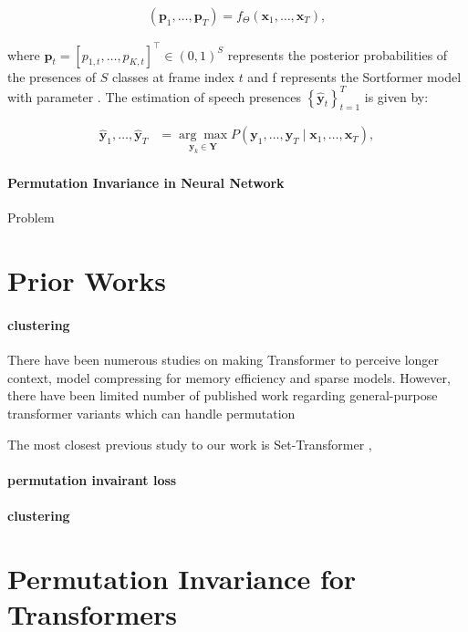\documentclass{article}
\begin{document}
\begin{align}
\left(\mathbf{p}_1, \ldots, \mathbf{p}_T\right) = f_{\Theta}\left(\mathbf{x}_1, \ldots, \mathbf{x}_T\right),
\end{align}

where \( \mathbf{p}_t = \left[p_{1, t}, \ldots, p_{K, t}\right]^{\top} \in (0,1)^S \) represents the posterior probabilities of the presences of \( S \) classes at frame index \( t \) and f represents the Sortformer model with parameter . The estimation of speech presences $\left\{\hat{\mathbf{y}}_t\right\}_{t=1}^T$ is given by:

\begin{align}
\hat{\mathbf{y}}_1, \ldots, \hat{\mathbf{y}}_T & = \underset{\mathbf{y}_k \in \mathbf{Y}}{\arg\max} P\left(\mathbf{y}_1, \ldots, \mathbf{y}_T \mid \mathbf{x}_1, \ldots, \mathbf{x}_T\right),
\end{align}




\paragraph{Permutation Invariance in Neural Network}
Problem 

\section{Prior Works}

\paragraph{clustering}
There have been numerous studies on making Transformer to perceive longer context, model compressing for memory efficiency and sparse models. However, there have been limited number of published work regarding general-purpose transformer variants which can handle permutation 

The most closest previous study to our work is Set-Transformer \cite{lee2019set}, 
\paragraph{permutation invairant loss}

\paragraph{clustering}


\section{Permutation Invariance for Transformers}
\end{document}

